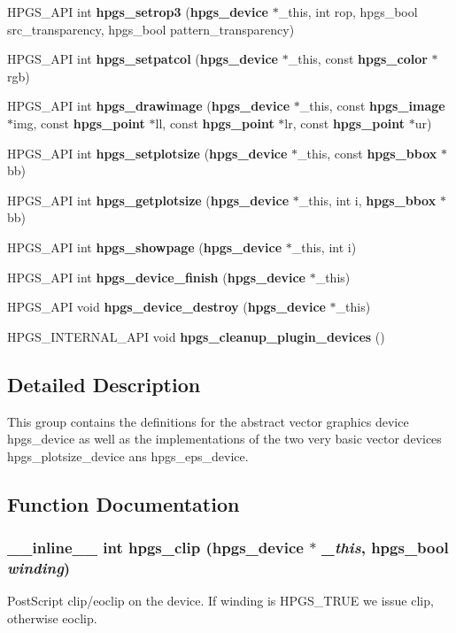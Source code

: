 \begin{DoxyCompactItemize}
HPGS\_\-API int {\bf hpgs\_\-setrop3} ({\bf hpgs\_\-device} $\ast$\_\-this, int rop, hpgs\_\-bool src\_\-transparency, hpgs\_\-bool pattern\_\-transparency)
\item 
HPGS\_\-API int {\bf hpgs\_\-setpatcol} ({\bf hpgs\_\-device} $\ast$\_\-this, const {\bf hpgs\_\-color} $\ast$rgb)
\item 
HPGS\_\-API int {\bf hpgs\_\-drawimage} ({\bf hpgs\_\-device} $\ast$\_\-this, const {\bf hpgs\_\-image} $\ast$img, const {\bf hpgs\_\-point} $\ast$ll, const {\bf hpgs\_\-point} $\ast$lr, const {\bf hpgs\_\-point} $\ast$ur)
\item 
HPGS\_\-API int {\bf hpgs\_\-setplotsize} ({\bf hpgs\_\-device} $\ast$\_\-this, const {\bf hpgs\_\-bbox} $\ast$bb)
\item 
HPGS\_\-API int {\bf hpgs\_\-getplotsize} ({\bf hpgs\_\-device} $\ast$\_\-this, int i, {\bf hpgs\_\-bbox} $\ast$bb)
\item 
HPGS\_\-API int {\bf hpgs\_\-showpage} ({\bf hpgs\_\-device} $\ast$\_\-this, int i)
\item 
HPGS\_\-API int {\bf hpgs\_\-device\_\-finish} ({\bf hpgs\_\-device} $\ast$\_\-this)
\item 
HPGS\_\-API void {\bf hpgs\_\-device\_\-destroy} ({\bf hpgs\_\-device} $\ast$\_\-this)
\item 
HPGS\_\-INTERNAL\_\-API void {\bfseries hpgs\_\-cleanup\_\-plugin\_\-devices} ()\label{group__device_gae99c6a46a83f5dc00f3e9cc3420356fb}

\end{DoxyCompactItemize}


\subsection{Detailed Description}
This group contains the definitions for the abstract vector graphics device {\ttfamily hpgs\_\-device} as well as the implementations of the two very basic vector devices {\ttfamily hpgs\_\-plotsize\_\-device} ans {\ttfamily hpgs\_\-eps\_\-device}. 

\subsection{Function Documentation}
\subsubsection[{hpgs\_\-clip}]{\setlength{\rightskip}{0pt plus 5cm}\_\-\_\-inline\_\-\_\- int hpgs\_\-clip ({\bf hpgs\_\-device} $\ast$ {\em \_\-this}, \/  hpgs\_\-bool {\em winding})\hspace{0.3cm}{\ttfamily  [static]}}\label{group__device_ga65f0a50bdae77921c1a2240d50e8fe31}
PostScript clip/eoclip on the device. If {\ttfamily winding} is {\ttfamily HPGS\_\-TRUE} we issue {\ttfamily clip}, otherwise {\ttfamily eoclip}. 

